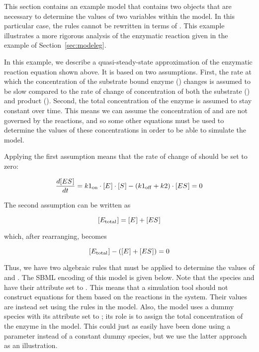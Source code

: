 This section contains an example model that contains two
\AlgebraicRule objects that are necessary to determine the values
of two variables within the model.  In this particular case, the
rules cannot be rewritten in terms of \AssignmentRule.  This
example illustrates a more rigorous analysis of the enzymatic
reaction given in the example of Section~\ref{sec:modeleg}.
\begin{center}
\end{center}
In this example, we describe a quasi-steady-state approximation of
the enzymatic reaction equation shown above.  It is based on two
assumptions.  First, the rate at which the concentration of the
substrate bound enzyme () changes is assumed to be
slow compared to the rate of change of concentration of both the
substrate () and product ().  Second, the
total concentration of the enzyme is assumed to stay constant over
time.  This means we can assume the concentration of 
and  are not governed by the reactions, and so some
other equations must be used to determine the values of these
concentrations in order to be able to simulate the model.

Applying the first assumption means that the rate of change of
 should be set to zero:
\begin{linenomath}
\begin{equation*}
  \dfrac{d \concent{ES}}{d t} = k1\sub{on} \cdot \concent{E} \cdot \concent{S}
     - (k1\sub{off} + k2) \cdot \concent{ES} = 0
\end{equation*}
\end{linenomath}

The second assumption can be written as
\begin{linenomath}
\begin{equation*}
  \concent{E\sub{total}} = \concent{E} + \concent{ES}
\end{equation*}
\end{linenomath}
which, after rearranging, becomes
\begin{linenomath}
\begin{equation*}
  \concent{E\sub{total}} - (\concent{E} + \concent{ES}) = 0
\end{equation*}
\end{linenomath}

Thus, we have two algebraic rules that must be applied to
determine the values of  and .  The SBML
encoding of this model is given below.  Note that the species
 and  have their 
attribute set to .  This means that a simulation tool
should not construct equations for them based on the reactions in
the system.  Their values are instead set using the rules in the
model.  Also, the model uses a dummy species
 with its  attribute set to
; its role is to assign the total concentration of the
enzyme in the model.  This could just as easily have been done
using a parameter instead of a constant dummy species, but we use
the latter approach as an illustration.

